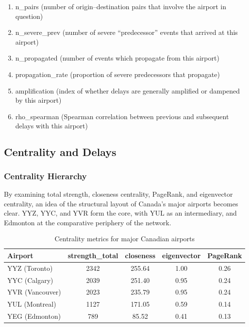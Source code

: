 \documentclass[9pt]{article}
\begin{document}
\begin{enumerate}[label=\arabic*.]
    \item n\_pairs (number of origin–destination pairs that involve the airport in question)
    \item n\_severe\_prev (number of severe ``predecessor'' events that arrived at this airport)
    \item n\_propagated (number of events which propagate from this airport)
    \item propagation\_rate (proportion of severe predecessors that propagate)
    \item amplification (index of whether delays are generally amplified or dampened by this airport)
    \item rho\_spearman (Spearman correlation between previous and subsequent delays with this airport)
\end{enumerate}

\subsection{Centrality and Delays}

\subsubsection{Centrality Hierarchy}

By examining total strength, closeness centrality, PageRank, and eigenvector centrality, an idea of the structural layout of Canada's major airports becomes clear. YYZ, YYC, and YVR form the core, with YUL as an intermediary, and Edmonton at the comparative periphery of the network.

\begin{table}[h!]
    \centering
    \caption{Centrality metrics for major Canadian airports}
    \begin{tabular}{lcccc}
        \toprule
        Airport & strength\_total & closeness & eigenvector & PageRank \\
        \midrule
        YYZ (Toronto)   & 2342 & 255.64 & 1.00 & 0.26 \\
        YYC (Calgary)   & 2039 & 251.40 & 0.95 & 0.24 \\
        YVR (Vancouver) & 2023 & 235.79 & 0.95 & 0.24 \\
        YUL (Montreal)  & 1127 & 171.05 & 0.59 & 0.14 \\
        YEG (Edmonton)  & 789  & 85.52  & 0.41 & 0.13 \\
        \bottomrule
    \end{tabular}
\end{table}
\end{document}
